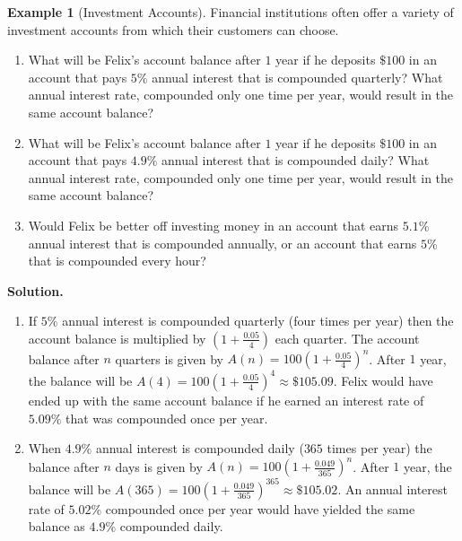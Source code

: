 \documentclass[10pt,]{book}
\theoremstyle{plain}
\theoremstyle{definition}
\theoremstyle{definition}
\newtheorem{example}[theorem]{Example}
\theoremstyle{definition}
\numberwithin{equation}{section}
\begin{document}
\begin{example}[Investment Accounts]\label{chapter04-section05-investment-accounts}
\hypertarget{p-204}{}%
Financial institutions often offer a variety of investment accounts from which their customers can choose.%
\leavevmode%
\begin{enumerate}
\item\hypertarget{li-99}{}What will be Felix’s account balance after \(1\) year if he deposits \(\$100\) in an account that pays \(5\%\) annual interest that is compounded quarterly? What annual interest rate, compounded only one time per year, would result in the same account balance?%
\item\hypertarget{li-100}{}What will be Felix’s account balance after \(1\) year if he deposits \(\$100\) in an account that pays \(4.9\%\) annual interest that is compounded daily? What annual interest rate, compounded only one time per year, would result in the same account balance?%
\item\hypertarget{li-101}{}Would Felix be better off investing money in an account that earns \(5.1\%\) annual interest that is compounded annually, or an account that earns \(5\%\) that is compounded every hour?%
\end{enumerate}
\par\smallskip%
\noindent\textbf{Solution.}\hypertarget{solution-13}{}\quad%
\leavevmode%
\begin{enumerate}
\item\hypertarget{li-102}{}If \(5\%\) annual interest is compounded quarterly (four times per year) then the account balance is multiplied by \((1+\frac{0.05}{4})\) each quarter. The account balance after \(n\) quarters is given by \(A(n)=100(1+\frac{0.05}{4})^n\). After \(1\) year, the balance will be \(A(4)=100(1+\frac{0.05}{4})^4 \approx \$105.09\). Felix would have ended up with the same account balance if he earned an interest rate of \(5.09\%\) that was compounded once per year.%
\item\hypertarget{li-103}{}When \(4.9\%\) annual interest is compounded daily (\(365\) times per year) the balance after \(n\) days is given by  \(A(n)=100(1+\frac{0.049}{365})^n\). After \(1\) year, the balance will be \(A(365) = 100(1+\frac{0.049}{365})^{365} \approx \$105.02\). An annual interest rate of \(5.02\%\) compounded once per year would have yielded the same balance as \(4.9\%\) compounded daily.%

\end{enumerate}
\end{example}
\end{document}
